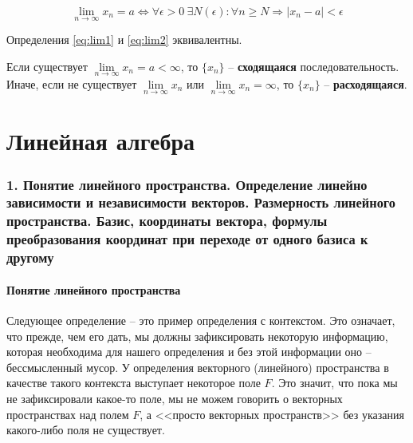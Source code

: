 \documentclass{article}
\begin{document}
\begin{equation}\label{eq:lim2}
	\lim_{n \to \infty} x_n = a \Leftrightarrow \forall \epsilon > 0\ \exists N (\epsilon) \colon \forall n \ge N \Rightarrow \mathopen| x_n - a \mathclose| < \epsilon
\end{equation}

Определения \eqref{eq:lim1} и \eqref{eq:lim2} эквивалентны. 

Если существует $\lim\limits_{n \to \infty} x_n = a < \infty$, то $\{x_n\}$ -- \textbf{сходящаяся} последовательность. Иначе, если не существует  $\lim\limits_{n \to \infty} x_n$ или $\lim\limits_{n \to \infty} x_n = \infty$, то $\{x_n\}$ -- \textbf{расходящаяся}.
\pagebreak




\part*{Линейная алгебра }

\section*{1. Понятие линейного пространства. Определение линейно зависимости и независимости векторов. Размерность линейного пространства. Базис, координаты вектора, формулы преобразования координат при переходе от одного базиса к другому}

\subsection*{Понятие линейного пространства}

Следующее определение -- это пример определения с контекстом.
Это означает, что прежде, чем его дать, мы должны зафиксировать некоторую информацию, которая необходима для нашего определения и без этой информации оно -- бессмысленный мусор.
У определения векторного (линейного) пространства в качестве такого контекста выступает некоторое поле $F$.
Это значит, что пока мы не зафиксировали какое-то поле, мы не можем говорить о векторных пространствах над полем $F$, а <<просто векторных пространств>> без указания какого-либо поля не существует.
\end{document}

